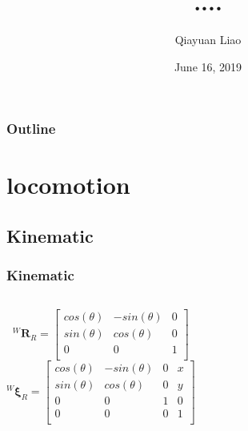 \documentclass{beamer}
\title{....}
\author{Qiayuan Liao\inst{1}}
\date{June 16, 2019}
\institute[] %
{
  \inst{1}
  liaoqiayuan@gmail.com
}
\begin{document}
\begin{frame}
  \titlepage
\end{frame}

\begin{frame}
  \frametitle{Outline}
  \tableofcontents
\end{frame}
\section{locomotion}
\subsection{Kinematic}
\begin{frame}
\frametitle{Kinematic}
\begin{columns}
  \begin{equation}
  ^W\mathbf{R}_R =
    \begin{bmatrix}
      cos(\theta) & -sin(\theta) & 0 \\
      sin(\theta) &  cos(\theta) & 0 \\
      0 &  0 & 1 \\
    \end{bmatrix}
  \end{equation}
  \begin{equation}
    ^W\mathbf{\xi}_R =
      \begin{bmatrix}
        cos(\theta) & -sin(\theta) & 0 & x\\
        sin(\theta) &  cos(\theta) & 0 & y\\
        0 & 0 & 1 & 0 \\
        0 & 0 & 0 & 1 \\
      \end{bmatrix}
  \end{equation}


\end{columns}
\end{frame}
\end{document}
